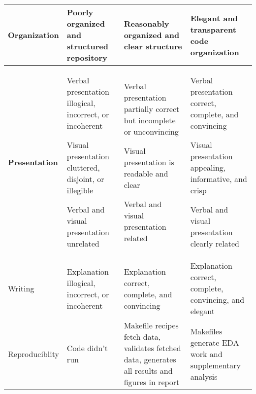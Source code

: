 \begin{tabular}{|>{\bf}l|>{\raggedright}p{4cm}|>{\raggedright}p{4cm}|>{\raggedright\arraybackslash}p{4cm}|}
Organization
 & 
Poorly organized and structured repository
 & 
Reasonably organized and clear structure
 & 
Elegant and transparent code organization
 \\
\hline

Presentation
 & 
Verbal presentation illogical, incorrect, or incoherent

Visual presentation cluttered, disjoint, or illegible

Verbal and visual presentation unrelated
 & 
Verbal presentation partially correct but incomplete or unconvincing

Visual presentation is readable and clear

Verbal and visual presentation related
 & 
Verbal presentation correct, complete, and convincing

Visual presentation appealing, informative, and crisp

Verbal and visual presentation clearly related
 \\
\hline

Writing
 & 
Explanation illogical, incorrect, or incoherent
 & 
Explanation correct, complete, and convincing
 & 
Explanation correct, complete, convincing, and elegant
 \\
\hline

Reproduciblity
 & 
Code didn't run
 & 
Makefile recipes fetch data, validates fetched data, generates all results and figures in report
 & 
Makefiles generate EDA work and supplementary analysis
 \\
\hline

\end{tabular}
